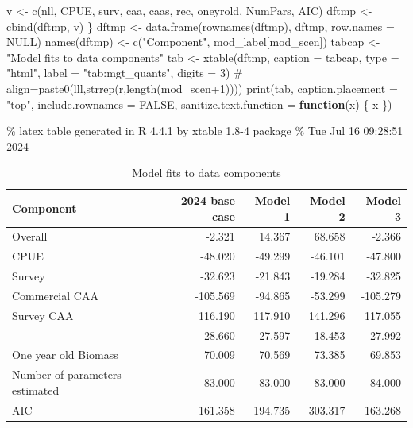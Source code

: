 \documentclass[
  letterpaper,
  DIV=11,
  numbers=noendperiod]{scrartcl}
\newenvironment{Shaded}{\begin{snugshade}}{\end{snugshade}}
\newcommand{\AttributeTok}[1]{\textcolor[rgb]{0.40,0.45,0.13}{#1}}
\newcommand{\CommentTok}[1]{\textcolor[rgb]{0.37,0.37,0.37}{#1}}
\newcommand{\ConstantTok}[1]{\textcolor[rgb]{0.56,0.35,0.01}{#1}}
\newcommand{\ControlFlowTok}[1]{\textcolor[rgb]{0.00,0.23,0.31}{\textbf{#1}}}
\newcommand{\DecValTok}[1]{\textcolor[rgb]{0.68,0.00,0.00}{#1}}
\newcommand{\FunctionTok}[1]{\textcolor[rgb]{0.28,0.35,0.67}{#1}}
\newcommand{\NormalTok}[1]{\textcolor[rgb]{0.00,0.23,0.31}{#1}}
\newcommand{\OtherTok}[1]{\textcolor[rgb]{0.00,0.23,0.31}{#1}}
\newcommand{\StringTok}[1]{\textcolor[rgb]{0.13,0.47,0.30}{#1}}
\begin{document}
\begin{Shaded}
\begin{Highlighting}[]
\NormalTok{    v }\OtherTok{\textless{}{-}} \FunctionTok{c}\NormalTok{(nll, CPUE, surv, caa, caas, rec, oneyrold, NumPars, AIC)}
\NormalTok{    dftmp }\OtherTok{\textless{}{-}} \FunctionTok{cbind}\NormalTok{(dftmp, v)}
\NormalTok{\}}
\NormalTok{dftmp }\OtherTok{\textless{}{-}} \FunctionTok{data.frame}\NormalTok{(}\FunctionTok{rownames}\NormalTok{(dftmp), dftmp, }\AttributeTok{row.names =} \ConstantTok{NULL}\NormalTok{)}
\FunctionTok{names}\NormalTok{(dftmp) }\OtherTok{\textless{}{-}} \FunctionTok{c}\NormalTok{(}\StringTok{"Component"}\NormalTok{, mod\_label[mod\_scen])}
\NormalTok{tabcap }\OtherTok{\textless{}{-}} \StringTok{"Model fits to data components"}
\NormalTok{tab }\OtherTok{\textless{}{-}} \FunctionTok{xtable}\NormalTok{(dftmp, }\AttributeTok{caption =}\NormalTok{ tabcap, }\AttributeTok{type =} \StringTok{"html"}\NormalTok{, }\AttributeTok{label =} \StringTok{"tab:mgt\_quants"}\NormalTok{, }\AttributeTok{digits =} \DecValTok{3}\NormalTok{)}
\CommentTok{\# align=paste0(\textquotesingle{}lll\textquotesingle{},strrep(\textquotesingle{}r\textquotesingle{},length(mod\_scen+1))))}
\FunctionTok{print}\NormalTok{(tab, }\AttributeTok{caption.placement =} \StringTok{"top"}\NormalTok{, }\AttributeTok{include.rownames =} \ConstantTok{FALSE}\NormalTok{, }\AttributeTok{sanitize.text.function =} \ControlFlowTok{function}\NormalTok{(x) \{}
\NormalTok{    x}
\NormalTok{\})}
\end{Highlighting}
\end{Shaded}

\% latex table generated in R 4.4.1 by xtable 1.8-4 package \% Tue Jul
16 09:28:51 2024

\begin{table}[ht]
\centering
\caption{Model fits to data components} 

\begin{tabular}{lrrrr}
  \hline
Component & 2024 base case & Model 1 & Model 2 & Model 3 \\ 
  \hline
Overall & -2.321 & 14.367 & 68.658 & -2.366 \\ 
  CPUE & -48.020 & -49.299 & -46.101 & -47.800 \\ 
  Survey & -32.623 & -21.843 & -19.284 & -32.825 \\ 
  Commercial CAA & -105.569 & -94.865 & -53.299 & -105.279 \\ 
  Survey CAA & 116.190 & 117.910 & 141.296 & 117.055 \\ 
   & 28.660 & 27.597 & 18.453 & 27.992 \\ 
  One year old Biomass & 70.009 & 70.569 & 73.385 & 69.853 \\ 
  Number of parameters estimated & 83.000 & 83.000 & 83.000 & 84.000 \\ 
  AIC & 161.358 & 194.735 & 303.317 & 163.268 \\ 
   \hline
\end{tabular}
\end{table}
\end{document}
